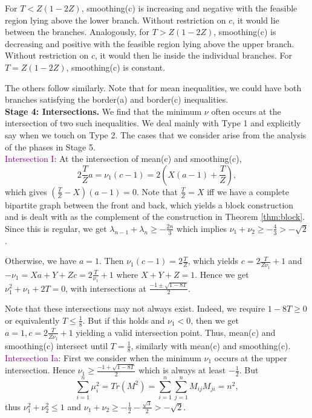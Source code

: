 \documentclass[11pt]{article}
\newcommand{\purp}[1]{\textcolor{purple}{#1}}
\begin{document}
For $T < Z(1-2Z)$, smoothing(c) is increasing and negative with the feasible region lying above the lower branch. Without restriction on $c$, it would lie between the branches. Analogously, for $T > Z(1-2Z)$, smoothing(c) is decreasing and positive with the feasible region lying above the upper branch. Without restriction on $c$, it would then lie inside the individual branches. For $T = Z(1-2Z)$, smoothing(c) is constant. 

The others follow similarly. Note that for mean inequalities, we could have both branches satisfying the border(a) and border(c) inequalities. \\

\textbf{Stage 4: Intersections.} We find that the minimum $\nu$ often occurs at the intersection of two such inequalities. We deal mainly with Type 1 and explicitly say when we touch on Type 2. The cases that we consider arise from the analysis of the phases in Stage 5. \\

\purp{Intersection I}: At the intersection of mean(c) and smoothing(c), 
\[2\frac{T}{Z}a = \nu_1(c-1) = 2\left(X(a-1) + \frac{T}{Z}\right),\]
which gives $(\frac{T}{Z} - X)(a-1) = 0$. Note that $\frac{T}{Z} = X$ iff we have a complete bipartite graph between the front and back, which yields a block construction and is dealt with as the complement of the construction in Theorem \ref{thm:block}. Since this is regular, we get $\lambda_{n-1} + \lambda_n \ge -\frac{2n}{3}$ which implies $\nu_1 + \nu_2 \ge -\frac{4}{3} > -\sqrt{2}$. 

Otherwise, we have $a = 1$. Then $\nu_1(c-1) = 2\frac{T}{Z}$, which yields $c = 2\frac{T}{Z\nu_1} + 1$ and $-\nu_1 = Xa + Y + Zc = 2\frac{T}{\nu_1} + 1$ where $X + Y + Z = 1$. Hence we get $\nu_1^2 + \nu_1 + 2T = 0$, with intersections at $\frac{-1\pm \sqrt{1-8T}}{2}$.     

Note that these intersections may not always exist. Indeed, we require $1-8T \ge 0$ or equivalently $T \le \frac18$. But if this holds and $\nu_1 < 0$, then we get $a = 1, c = 2 \frac{T}{Z\nu_1} + 1$ yielding a valid intersection point. Thus, mean(c) and smoothing(c) intersect until $T = \frac18$, similarly with mean(c) and smoothing(c).\\

\purp{Intersection Ia}: First we consider when the minimum $\nu_1$ occurs at the upper intersection. Hence $\nu_1 \ge \frac{-1+\sqrt{1-8T}}{2}$ which is always at least $-\frac12$. But
\[\sum_{i = 1}^n \mu_i^2 = Tr(M^2) = \sum_{i = 1}^n \sum_{j = 1}^n M_{ij} M_{ji} = n^2,\]
thus $\nu_1^2 + \nu_2^2 \le 1$ and $\nu_1 + \nu_2 \ge -\frac12 - \frac{\sqrt{3}}2 > -\sqrt{2}$.\\
\end{document}
